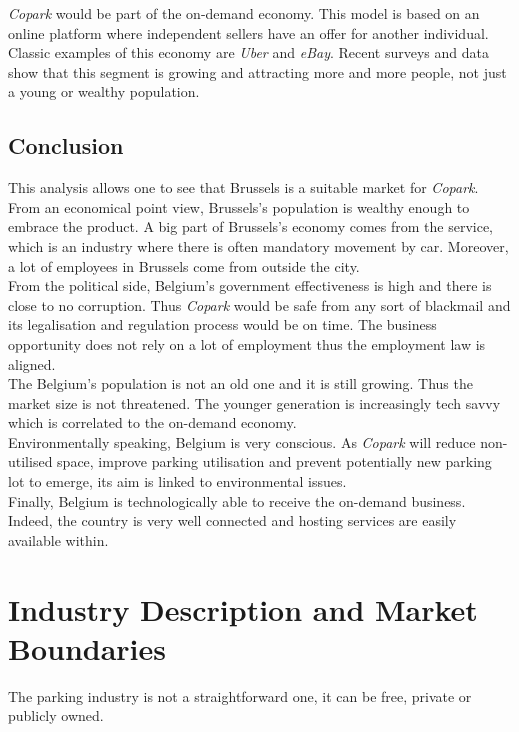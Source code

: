 \documentclass[12pt,a4paper,oneside]{book}
\newcommand{\bp}{\textit{Copark}}
\begin{document}
\bp{} would be part of the on-demand economy. This model is based on an online platform where independent sellers have an offer for another individual. Classic examples of this economy are \textit{Uber} and \textit{eBay}. Recent surveys and data show that this segment is growing and attracting more and more people, not just a young or wealthy population.

\subsection{Conclusion}
This analysis allows one to see that Brussels is a suitable market for \bp{}.\\

From an economical point view, Brussels's population is wealthy enough to embrace the product. A big part of Brussels's economy comes from the service, which is an industry where there is often mandatory movement by car. Moreover, a lot of employees in Brussels come from outside the city.\\

From the political side, Belgium's government effectiveness is high and there is close to no corruption. Thus \bp{} would be safe from any sort of blackmail and its legalisation and regulation process would be on time. The business opportunity does not rely on a lot of employment thus the employment law is aligned.\\

The Belgium's population is not an old one and it is still growing. Thus the market size is not threatened. The younger generation is increasingly tech savvy which is correlated to the on-demand economy.\\

Environmentally speaking, Belgium is very conscious. As \bp{} will reduce non-utilised space, improve parking utilisation and prevent potentially new parking lot to emerge, its aim is linked to environmental issues.\\

Finally, Belgium is technologically able to receive the on-demand business. Indeed, the country is very well connected and hosting services are easily available within.

\section{Industry Description and Market Boundaries}
The parking industry is not a straightforward one, it can be free, private or publicly owned.\\
\end{document}
